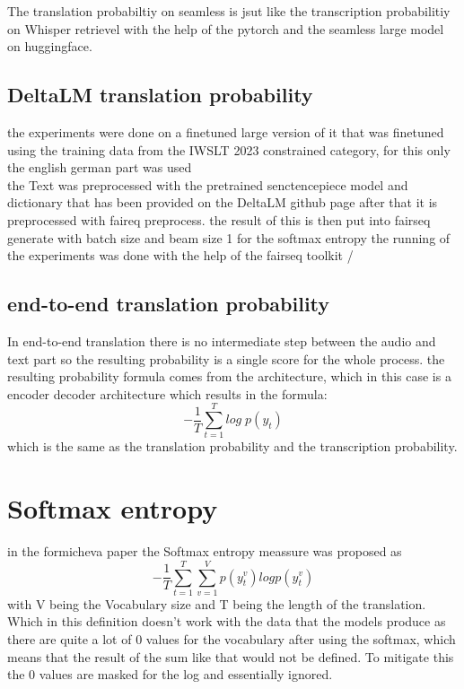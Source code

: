 The translation probabiltiy on seamless is jsut like the transcription probabilitiy on Whisper retrievel with the help of the pytorch and the seamless large model on huggingface. 


\subsection{DeltaLM translation probability}
the experiments \cite{ma2021deltalm} were done on a finetuned large version of it that was finetuned using the training data from the IWSLT 2023 constrained category, for this only the english german part was used
\\
the Text was preprocessed with the pretrained senctencepiece model and dictionary that has been provided on the DeltaLM github page after that it is preprocessed with faireq preprocess. the result of this is then put into fairseq generate with batch size and beam size 1 for the softmax entropy 
the running of the experiments was done with the help of the fairseq toolkit \cite{ott2019fairseqfastextensibletoolkit}/\cite{ott2019fairseq}

\subsection{end-to-end translation probability}
In end-to-end translation there is no intermediate step between the audio and text part so the resulting probability is a single score for the whole process.
the resulting probability formula comes from the architecture, which in this case is a encoder decoder architecture which results in the formula: $$-\frac{1}{T}\sum_{t=1}^T log\; p(y_t)$$ which is the same as the translation probability and the transcription probability. 

\section{Softmax entropy}
in the formicheva \cite{fomicheva2020unsupervised} paper the Softmax entropy meassure was proposed as $$-\frac{1}{T}\sum_{t=1}^T\sum_{v=1}^Vp(y_t^v)logp(y_t^v) \label{formula:translation probability}$$ with V being the Vocabulary size and T being the length of the translation. Which in this definition doesn't work with the data that the models produce as there are quite a lot of 0 values for the vocabulary after using the softmax, which means that the result of the sum like that would not be defined. To mitigate this the 0 values are masked for the log and essentially ignored. 

